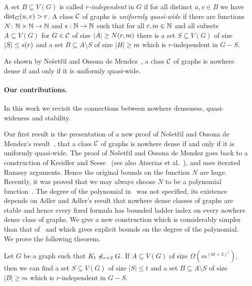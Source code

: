 \begin{definition}
A set $B\subseteq V(G)$ is called {\em{$r$-independent}} in $G$ if for all
distinct $u,v\in B$ we have $\mathrm{dist}_G(u,v)>r$.
A class $\mathcal{C}$ of graphs is \emph{uniformly quasi-wide} if there are
functions $N\colon \mathbb{N}\times\mathbb{N}\rightarrow \mathbb{N}$ and $s:\mathbb{N}\rightarrow \mathbb{N}$ such
that for all $r,m\in \mathbb{N}$ and all subsets $A\subseteq V(G)$ for
$G\in \mathcal{C}$ of size $\left\lvert A\right\rvert\geq N(r,m)$ there is a set
$S\subseteq V(G)$ of size $\left\lvert S\right\rvert\leq s(r)$ and a set
$B\subseteq A\setminus S$ of size $\left\lvert B\right\rvert\geq m$ which is $r$-independent in
$G-S$. 
\end{definition}

As shown by Ne\v{s}et\v{r}il and Ossona de Mendez~\cite{nevsetvril2010first},
a class $\mathcal{C}$ of graphs is nowhere dense if and only if it
is uniformly quasi-wide.

\paragraph{Our contributions.} In this work we revisit the 
connections between nowhere denseness, quasi-wideness and
stability. 

Our first result is the presentation of a new proof of 
Ne\v{s}et\v{r}il and Ossona de Mendez's result~\cite{nevsetvril2010first},
that a class $\mathcal{C}$ of graphs is nowhere dense if and only if it
is uniformly quasi-wide. The proof of Ne\v{s}et\v{r}il 
and Ossona de Mendez goes back to a construction
of Kreidler and Seese~\cite{kreidler1998monadic} (see also Atserias et al.~\cite{atserias2006preservation}), 
and uses iterated Ramsey arguments. Hence the original bounds on 
the function $N$ are huge. Recently, 
it was proved that we may always choose $N$ to be a polynomial 
function~\cite{siebertz2016polynomial}. The degree of the polynomial 
in~\cite{siebertz2016polynomial} was  not specified, its existence 
depends on Adler and Adler's result that nowhere dense classes of graphs
are stable and hence every fixed formula has bounded ladder index 
on every nowhere dense class of graphs. We give a new construction 
which is considerably simpler than that of~\cite{siebertz2016polynomial}
and which gives explicit bounds on the degree of the polynomial. 
We prove the following theorem. 

\begin{theorem}\label{thm:new-uqw}
Let $G$ be a graph such that $K_t\not\preccurlyeq_{r+2} G$. 
If $A\subseteq V(G)$ of size $\Omega(m^{(6t+3)^r})$, then we can find a set
$S\subseteq V(G)$ of size $|S|\leq t$ and a set $B\subseteq A\setminus S$ 
of size $|B|\geq m$ which is $r$-independent in $G-S$.  
\end{theorem}

